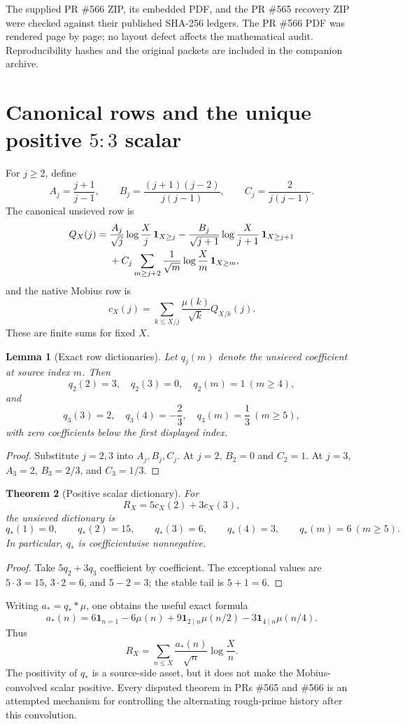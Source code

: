 \documentclass[11pt]{article}
\newtheorem{theorem}{Theorem}[section]
\newtheorem{lemma}[theorem]{Lemma}
\newcommand{\1}{\mathbf 1}
\newcommand{\qstar}{q_{\!*}}
\begin{document}
The supplied PR \#566 ZIP, its embedded PDF, and the PR \#565 recovery ZIP were checked against their published SHA-256 ledgers.  The PR \#566 PDF was rendered page by page; no layout defect affects the mathematical audit.  Reproducibility hashes and the original packets are included in the companion archive.

\section{Canonical rows and the unique positive $5{:}3$ scalar}

For $j\ge2$, define
\[
A_j=\frac{j+1}{j-1},\qquad
B_j=\frac{(j+1)(j-2)}{j(j-1)},\qquad
C_j=\frac2{j(j-1)}.
\]
The canonical unsieved row is
\begin{align}
Q_X(j)={}&\frac{A_j}{\sqrt j}\log\frac Xj\,\1_{X\ge j}
-\frac{B_j}{\sqrt{j+1}}\log\frac X{j+1}\,\1_{X\ge j+1}\notag\\
&+C_j\sum_{m\ge j+2}\frac1{\sqrt m}\log\frac Xm\,\1_{X\ge m},
\end{align}
and the native Mobius row is
\[
c_X(j)=\sum_{k\le X/j}\frac{\mu(k)}{\sqrt k}Q_{X/k}(j).
\]
These are finite sums for fixed $X$.

\begin{lemma}[Exact row dictionaries]
Let $q_j(m)$ denote the unsieved coefficient at source index $m$.  Then
\[
q_2(2)=3,\quad q_2(3)=0,\quad q_2(m)=1\ (m\ge4),
\]
and
\[
q_3(3)=2,\quad q_3(4)=-\frac23,\quad q_3(m)=\frac13\ (m\ge5),
\]
with zero coefficients below the first displayed index.
\end{lemma}
\begin{proof}
Substitute $j=2,3$ into $A_j,B_j,C_j$.  At $j=2$, $B_2=0$ and $C_2=1$.  At $j=3$, $A_3=2$, $B_3=2/3$, and $C_3=1/3$.
\end{proof}

\begin{theorem}[Positive scalar dictionary]
For
\[
R_X=5c_X(2)+3c_X(3),
\]
the unsieved dictionary is
\[
\qstar(1)=0,\qquad \qstar(2)=15,\qquad \qstar(3)=6,
\qquad \qstar(4)=3,
\qquad \qstar(m)=6\ (m\ge5).
\]
In particular, $\qstar$ is coefficientwise nonnegative.
\end{theorem}
\begin{proof}
Take $5q_2+3q_3$ coefficient by coefficient.  The exceptional values are
$5\cdot3=15$, $3\cdot2=6$, and $5-2=3$; the stable tail is $5+1=6$.
\end{proof}

Writing $a_{\!*}=\qstar*\mu$, one obtains the useful exact formula
\[
a_{\!*}(n)=6\1_{n=1}-6\mu(n)
+9\1_{2\mid n}\mu(n/2)-3\1_{4\mid n}\mu(n/4).
\]
Thus
\[
R_X=\sum_{n\le X}\frac{a_{\!*}(n)}{\sqrt n}\log\frac Xn.
\]
The positivity of $\qstar$ is a source-side asset, but it does not make the Mobius-convolved scalar positive.  Every disputed theorem in PRs \#565 and \#566 is an attempted mechanism for controlling the alternating rough-prime history after this convolution.
\end{document}
